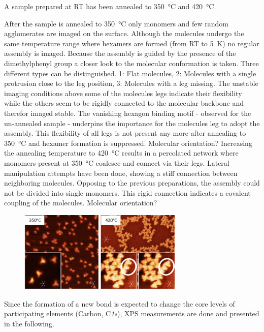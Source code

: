 A sample prepared at RT has been annealed to \SI{350}{\celsius} and \SI{420}{\celsius}.

After the sample is annealed to \SI{350}{\celsius} only monomers and few random agglomerates are imaged on the surface. Although the molecules undergo the same temperature range where hexamers are formed (from RT to \SI{5}{\kelvin}) no regular assembly is imaged. Because the assembly is guided by the presence of the dimethylphenyl group a closer look to the molecular conformation is taken. Three different types can be distinguished. 1: Flat molecules, 2: Molecules with a single protrusion close to the leg position, 3: Molecules with a leg missing.
The unstable imaging conditions above some of the molecules legs indicate their flexibility while the others seem to be rigidly connected to the molecular backbone and therefor imaged stable. The vanishing hexagon binding motif - observed for the un-annealed sample - underpins the importance for the molecules leg to adopt the assembly. This flexibility of all legs is not present any more after annealing to \SI{350}{\celsius} and hexamer formation is suppressed. Molecular orientation?
Increasing the annealing temperature to \SI{420}{\celsius} results in a percolated network where monomers present at \SI{350}{\celsius} coalesce and connect via their legs. Lateral manipulation attempts have been done, showing a stiff connection between neighboring molecules. Opposing to the previous preparations, the assembly could not be divided into single monomers. This rigid connection indicates a covalent coupling of the molecules. 
Molecular orientation?

\begin{figure}[] \centering
	\includegraphics[width=0.7\textwidth]{./images/hbbnc-ag-111-annealed}
	\caption{}
	\label{}
\end{figure}

Since the formation of a new bond is expected to change the core levels of participating elements (Carbon, C\textit{1s}), XPS measurements are done and presented in the following.

